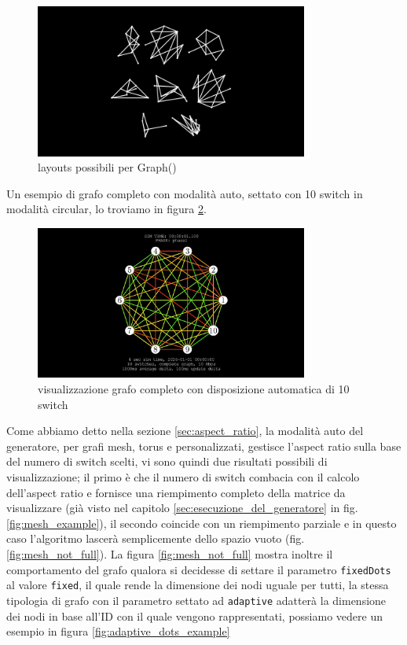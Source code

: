 \documentclass[binding=0.6cm]{sapthesis}
\begin{document}
\begin{figure}[h]
    \centering
    \includegraphics[width=0.8\textwidth]{immagini/graph_layouts_types.png}
    \caption{layouts possibili per Graph()}
    \label{fig:graph_layouts_types}
\end{figure}


Un esempio di grafo completo con modalità auto, settato con 10 switch in modalità circular, lo troviamo in figura \ref{fig:custom_complete_autopositioning10}.

\begin{figure}[h]
    \centering
    \includegraphics[width=0.8\textwidth]{immagini/auto_complete_10.JPG}
    \caption{visualizzazione grafo completo con disposizione automatica di 10 switch}
    \label{fig:custom_complete_autopositioning10}
\end{figure}

Come abbiamo detto nella sezione \ref{sec:aspect_ratio}, la modalità auto del generatore, per grafi mesh, torus e personalizzati, gestisce l'aspect ratio sulla base del numero di switch scelti, vi sono quindi
due risultati possibili di visualizzazione; il primo è che il numero di switch combacia con il calcolo dell'aspect ratio e fornisce una riempimento
completo della matrice da visualizzare (già visto nel capitolo \ref{sec:esecuzione_del_generatore} in fig. \ref{fig:mesh_example}), 
il secondo coincide con un riempimento parziale e in questo caso l'algoritmo lascerà semplicemente dello spazio vuoto (fig. \ref{fig:mesh_not_full}).
La figura \ref{fig:mesh_not_full} mostra inoltre il comportamento del grafo qualora si decidesse di settare il parametro \lstinline|fixedDots| al valore \lstinline|fixed|, 
il quale rende la dimensione dei nodi uguale per tutti, la stessa tipologia di grafo con il parametro settato ad \lstinline|adaptive| adatterà la dimensione dei nodi
in base all'ID con il quale vengono rappresentati, possiamo vedere un esempio in figura \ref{fig:adaptive_dots_example}
\end{document}
